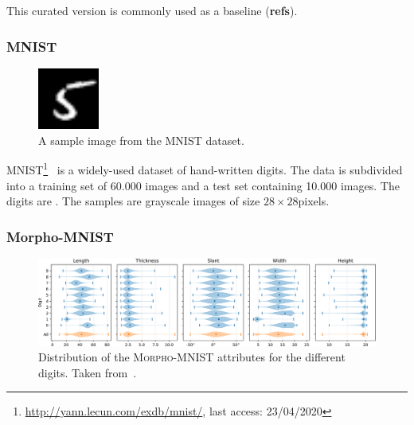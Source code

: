 This curated version is commonly used as a baseline (\textbf{refs}).

\subsubsection{MNIST}\label{subsubsec:mnist}

\begin{figure}
    \begin{center}
        \includegraphics[width=0.18\textwidth]{images/mnist_sample.png}
    \end{center}
    \caption[MNIST dataset sample image]{A sample image from the MNIST dataset.}
    \label{fig:mnist_sample}
\end{figure}

MNIST\footnote{\href{http://yann.lecun.com/exdb/mnist/}{http://yann.lecun.com/exdb/mnist/}, last access: 23/04/2020}~\citep{lecun1998gradient} is a widely-used dataset of hand-written digits.
The data is subdivided into a training set of 60.000 images and a test set containing 10.000 images.
The digits are .
The samples are grayscale images of size $28\times 28$pixels.

\subsubsection{Morpho-MNIST}\label{subsubsec:morphomnist}

\begin{figure}
    \centering
    \includegraphics[width=\textwidth]{images/morpho_mnist_distribution.png}
    \caption{Distribution of the \textsc{Morpho-MNIST} attributes for the different digits. Taken from~\citep{castro2019morpho}.}
    \label{fig:morpho_mnist_distribution}
\end{figure}

